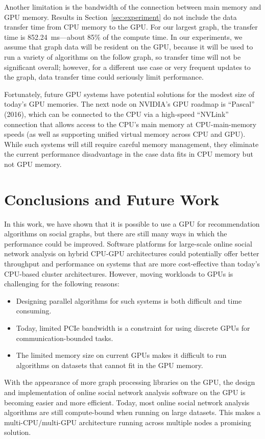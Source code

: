 \documentclass{article}
\begin{document}
Another limitation is the bandwidth of the connection between main memory and GPU memory. Results in Section~\ref{sec:experiment} do not include the data transfer time from CPU memory to the GPU\@. For our largest graph,  the transfer time is 852.24~ms---about 85\% of the compute time. In our experiments, we assume that graph data will be resident on the GPU, because it will be used to run a variety of algorithms on the follow graph, so transfer time will not be significant overall; however, for a different use case or very frequent updates to the graph, data transfer time could seriously limit performance.

Fortunately, future GPU systems have potential solutions for the modest size of today's GPU memories. The next node on NVIDIA's GPU roadmap is ``Pascal'' (2016), which can be connected to the CPU via a high-speed ``NVLink'' connection that allows access to the CPU's main memory at CPU-main-memory speeds (as well as supporting unified virtual memory across CPU and GPU\@). While such systems will still require careful memory management, they eliminate the current performance disadvantage in the case data fits in CPU memory but not GPU memory.


\section{Conclusions and Future Work} In this work, we have shown that it is possible to use a GPU for recommendation algorithms on social graphs, but there are still many ways in which the performance could be improved. Software platforms for large-scale online social network analysis on hybrid CPU-GPU architectures could potentially offer better throughput and performance on systems that are more cost-effective than today's CPU-based cluster architectures. However, moving workloads to GPUs is challenging for the following reasons:

\begin{itemize}
\item Designing parallel algorithms for such systems is both difficult and time consuming.
\item Today, limited PCIe bandwidth is a constraint for using discrete GPUs for communication-bounded tasks.
\item The limited memory size on current GPUs makes it difficult to run algorithms on datasets that cannot fit in the GPU memory.
\end{itemize}

With the appearance of more graph processing libraries on the GPU, the design and implementation of online social network analysis software on the GPU is becoming easier and more efficient. Today, most online social network analysis algorithms are still compute-bound when running on large datasets. This makes a multi-CPU/multi-GPU architecture running across multiple nodes a promising solution.
\end{document}
